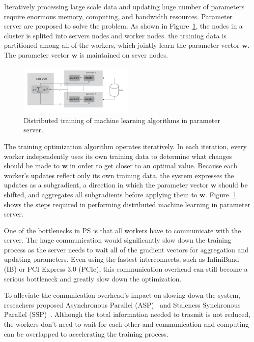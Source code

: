 \documentclass[sigconf]{acmart}
\begin{document}
Iteratively processing large scale data and updating huge number of parameters require enormous memory, computing, and bandwidth resources. Parameter server are proposed to solve the problem. As shown in Figure~\ref{fig:PS}, the nodes in a cluster is splited into servers nodes and worker nodes. the training data is partitioned among all of the workers, which jointly learn the parameter vector $\mathbf{w}$. The parameter vector $\mathbf{w}$ is maintained on sever nodes.

\begin{figure}[t]
	\includegraphics[width=0.5\textwidth]{PS.pdf}
	\caption{Distributed training of machine learning algorithms in parameter server.}\label{fig:PS}
\end{figure}

The training optimization algorithm operates iteratively. In each iteration, every worker independently uses its own training data to determine what changes should be made to $\mathbf{w}$ in order to get closer to an optimal value. Because each worker's updates reflect only its own training data, the system expresses the updates as a subgradient, a direction in which the parameter vector $\mathbf{w}$ should be shifted, and aggregates all subgradients before applying them to $\mathbf{w}$.  Figure~\ref{fig:PS} shows the steps required in performing distributed machine learning in parameter server.

One of the bottlenecks in PS is that all workers have to communicate with the server. The huge communication would significantly slow down the training process as the server needs to wait all of the gradient vectors for aggregation and updating parameters. Even using the fastest interconnects, such as InfiniBand (IB) or PCI Express 3.0 (PCIe), this communication overhead can still become a serious bottleneck and greatly slow down the optimization.

To alleviate the commnication overhead's impact on slowing down the system, reseachers proposed Asynchronous Parallel (ASP)~\cite{dean2012large} and Staleness Synchronous Parallel (SSP)~\cite{ho2013more}. Although the total information needed to trasmit is not reduced, the workers don't need to wait for each other and communication and computing can be overlapped to accelerating the training process.
\end{document}
